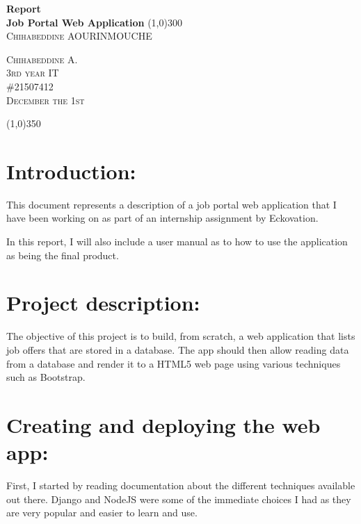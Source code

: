 \documentclass[french]{article}
\begin{document}
	\begin{titlepage}
		\begin{center}
			\huge{\bfseries Report\\Job Portal Web Application}
			\line(1,0){300}\\
			\vspace{0.25in}
			\textsc{\LARGE Chihabeddine AOURINMOUCHE\\}
			\vspace{12cm}
		\end{center}
		\begin{flushright}
			\textsc{\LARGE Chihabeddine A.\\
			3rd year IT\\
			\#21507412\\
			December the 1st\\}
		\end{flushright}
	\end{titlepage}
	
	\tableofcontents
	\vspace{0.25cm}
	
	\begin{center}
		\line(1,0){350}
	\end{center}
	
	\section{Introduction:}
		This document represents a description of a job portal web application that I have been working on as part of an internship assignment by Eckovation.
		
		In this report, I will also include a user manual as to how to use the application as being the final product.
		
	\section{Project description:}
		The objective of this project is to build, from scratch, a web application that lists job offers that are stored in a database. The app should then allow reading data from a database and render it to a HTML5 web page using various techniques such as Bootstrap.
		
	\section{Creating and deploying the web app:}
		First, I started by reading documentation about the different techniques available out there. Django and NodeJS were some of the immediate choices I had as they are very popular and easier to learn and use.
		
\end{document}
